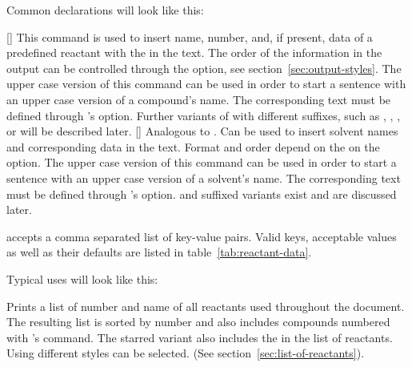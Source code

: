 \documentclass{chemmacros-manual}
\begin{document}
Common declarations will look like this:
\begin{sourcecode}
\end{sourcecode}

\begin{commands}
  []
    This command is used to insert name, number, and, if present, data of a
    predefined reactant with the  in the text. The order of the
    information in the output can be controlled through the
     option, see
    section~\vref{sec:output-styles}.  The upper case version of this command
     can be used in order to start a sentence with an upper case
    version of a compound's name. The corresponding text must be defined
    through 's  option. Further
    variants of  with different suffixes, such as \code{*},
    \code{+}, ,  or  will be described later.
  []
    Analogous to . Can be used to insert solvent names and
    corresponding data in the text. Format and order depend on the on the
     option. The upper case version of this
    command  can be used in order to start a sentence with an
    upper case version of a solvent's name. The corresponding text must be
    defined through  's  option.
     and  suffixed variants exist and are discussed later.
\end{commands}

 accepts a comma separated list of key-value pairs. Valid keys,
acceptable values as well as their defaults are listed in table~\vref{tab:reactant-data}.

Typical uses will look like this:
\begin{sourcecode}
\end{sourcecode}

\begin{commands}
    Prints a list of number and name of all reactants used throughout the
    document. The resulting list is sorted by number and also includes
    compounds numbered with 's  command. The starred
    variant also includes the  in the list of reactants. Using
     different styles can be selected. (See
    section~\vref{sec:list-of-reactants}).
\end{commands}
\end{document}
